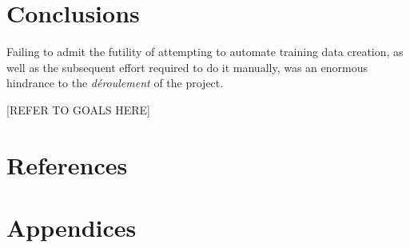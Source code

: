 \documentclass[11pt, oneside]{scrartcl}   	%
\begin{document}
\section{Conclusions}

Failing to admit the futility of attempting to automate training data creation, as well as the subsequent effort required to do it manually, was an enormous hindrance to the \emph{d\'eroulement} of the project.

[REFER TO GOALS HERE]

\section{References}



\section{Appendices}
\end{document}
